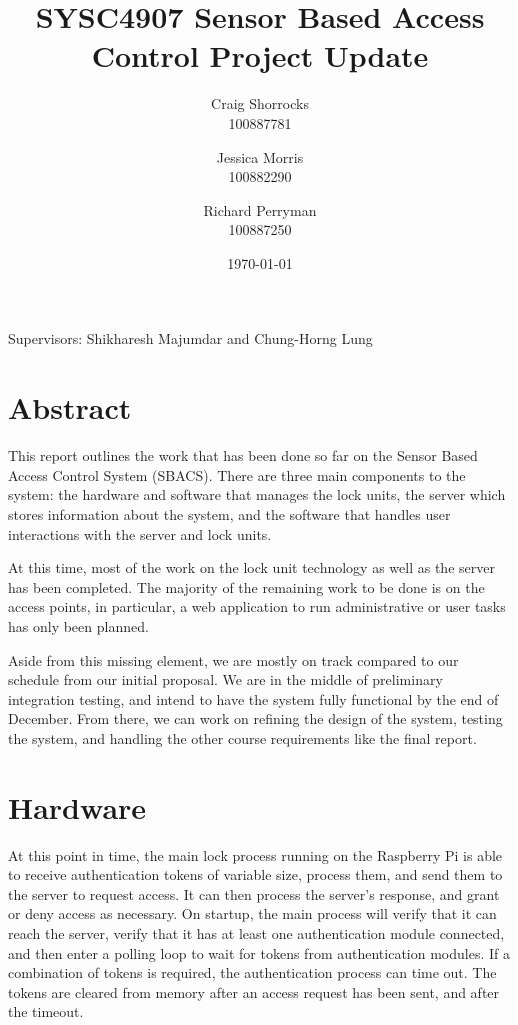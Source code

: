 \documentclass{article}
\title{SYSC4907 Sensor Based Access Control Project Update}
\author{
	Craig Shorrocks \\
	100887781
	\and
	Jessica Morris \\
	100882290
	\and
	Richard Perryman \\
	100887250
}
\date{\today}
\begin{document}
\maketitle

\begin{center}
Supervisors: Shikharesh Majumdar and Chung-Horng Lung
\end{center}

\pagebreak

\section{Abstract}

This report outlines the work that has been done so far on the Sensor Based Access Control System (SBACS). There are
three main components to the system: the hardware and software that manages the lock units, the server which stores
information about the system, and the software that handles user interactions with the server and lock units.

At this time, most of the work on the lock unit technology as well as the server has been completed. The majority of the
remaining work to be done is on the access points, in particular, a web application to run administrative or user tasks
has only been planned.

Aside from this missing element, we are mostly on track compared to our schedule from our initial proposal. We are in
the middle of preliminary integration testing, and intend to have the system fully functional by the end of December.
From there, we can work on refining the design of the system, testing the system, and handling the other course
requirements like the final report.

\section{Hardware}

At this point in time, the main lock process running on the Raspberry Pi is able to receive authentication tokens of 
variable size, process them, and send them to the server to request access. It can then process the server's response, 
and grant or deny access as necessary. On startup, the main process will verify that it can reach the server, verify 
that it has at least one authentication module connected, and then enter a polling loop to wait for tokens from 
authentication modules. If a combination of tokens is required, the authentication process can time out. The tokens are 
cleared from memory after an access request has been sent, and after the timeout.
\end{document}
